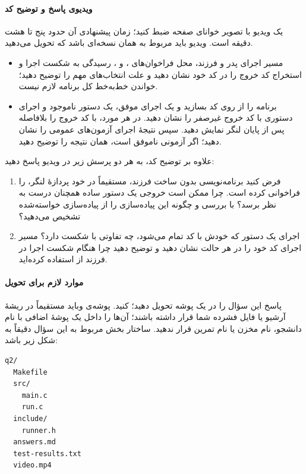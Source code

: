 \paragraph{ویدیوی پاسخ و توضیح کد}
یک ویدیو با تصویر خوانای صفحه ضبط کنید؛ زمان پیشنهادی آن
حدود پنج تا هشت دقیقه است. ویدیو باید مربوط به همان نسخه‌ای باشد که
تحویل می‌دهید.

\begin{itemize}
  \item مسیر اجرای پدر و فرزند، محل فراخوان‌های
  ،  و
  ، رسیدگی به شکست اجرا و استخراج کد خروج را
  در کد خود نشان دهید و علت انتخاب‌های مهم را توضیح دهید؛ خواندن
  خط‌به‌خط کل برنامه لازم نیست.
  \item برنامه را از روی کد بسازید و یک اجرای موفق، یک دستور ناموجود
  و اجرای دستوری با کد خروج غیرصفر را نشان دهید. در هر مورد، با
   کد خروج را بلافاصله پس از پایان لنگر نمایش
  دهید. سپس نتیجهٔ اجرای آزمون‌های عمومی را نشان دهید؛ اگر آزمونی
  ناموفق است، همان نتیجه را توضیح دهید.
\end{itemize}

علاوه بر توضیح کد، به هر دو پرسش زیر در ویدیو پاسخ دهید:

\begin{enumerate}
  \item فرض کنید برنامه‌نویسی بدون ساخت فرزند، مستقیماً در خود پردازهٔ
  لنگر،  را فراخوانی کرده است. چرا ممکن است
  خروجی یک دستور ساده همچنان درست به نظر برسد؟ با بررسی
   و  چگونه این پیاده‌سازی را
  از پیاده‌سازی خواسته‌شده تشخیص می‌دهید؟
  \item اجرای یک دستور که خودش با کد  تمام می‌شود،
  چه تفاوتی با شکست  دارد؟ مسیر اجرای کد خود
  را در هر حالت نشان دهید و توضیح دهید چرا هنگام شکست اجرا در فرزند
  از  استفاده کرده‌اید.
\end{enumerate}

\paragraph{موارد لازم برای تحویل}
پاسخ این سؤال را در یک پوشه 
تحویل دهید؛
کنید. پوشه‌‌ی  وباید مستقیماً
در ریشهٔ آرشیو  یا فایل فشرده شما قرار داشته باشند؛ آن‌ها را داخل یک پوشهٔ اضافی با نام
دانشجو، نام مخزن یا نام تمرین قرار ندهید. ساختار بخش مربوط به این
سؤال دقیقاً به شکل زیر باشد:

\begin{latin}
\begin{verbatim}
q2/
  Makefile
  src/
    main.c
    run.c
  include/
    runner.h
  answers.md
  test-results.txt
  video.mp4
\end{verbatim}
\end{latin}

